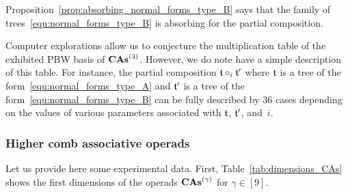 Proposition~\ref{prop:absorbing_normal_forms_type_B} says that the
family of trees~\eqref{equ:normal_forms_type_B} is absorbing
for the partial composition.
\medbreak

Computer explorations allow us to conjecture the multiplication table
of the exhibited PBW basis of $\mathbf{CAs}^{\left(3\right)}$. However, we do note have a
simple description of this table. For instance, the partial composition
$\mathfrak{t}\circ_i\mathfrak{t}'$ where $\mathfrak{t}$ is a tree of the
form~\eqref{equ:normal_forms_type_A} and $\mathfrak{t}'$ is a tree of the
form~\eqref{equ:normal_forms_type_B} can be fully described by $36$
cases depending on the values of various parameters associated with
$\mathfrak{t}$, $\mathfrak{t}'$, and~$i$.
\medbreak

\subsubsection{Higher comb associative operads}
\label{sec:higher_comb_associative_operads}
Let us provide here some experimental data. First,
Table~\ref{tab:dimensions_CAs} shows the first dimensions of the
operads $\mathbf{CAs}^{\left(\gamma\right)}$ for $\gamma \in [9]$.
